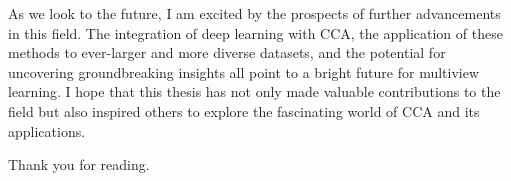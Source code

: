 As we look to the future, I am excited by the prospects of further advancements in this field. The integration of deep learning with CCA, the application of these methods to ever-larger and more diverse datasets, and the potential for uncovering groundbreaking insights all point to a bright future for multiview learning. I hope that this thesis has not only made valuable contributions to the field but also inspired others to explore the fascinating world of CCA and its applications.

Thank you for reading.